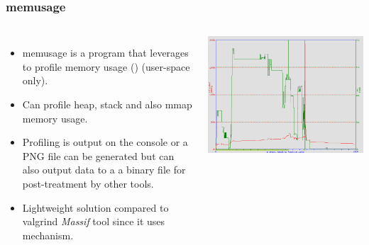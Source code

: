 \begin{frame}[fragile]
  \frametitle{memusage}
  \begin{columns}[T]
    \begin{itemize}
      \item memusage is a program that leverages  to profile
            memory usage () (user-space only).
      \item Can profile heap, stack and also mmap memory usage.
      \item Profiling is output on the console or a PNG file can be generated
            but can also output data to a a binary file for post-treatment by
            other tools.
      \item Lightweight solution compared to valgrind {\em Massif} tool since it
            uses  mechanism.
    \end{itemize}
    \includegraphics[width=\textwidth]{../slides/debugging-application-profiling/memusage.png}
  \end{columns}
\end{frame}

